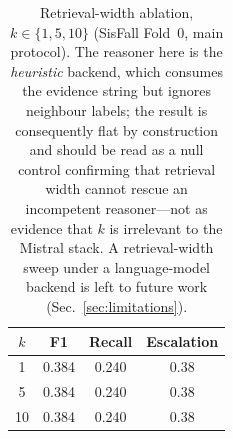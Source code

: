 \begin{table}[!t]
\centering
\caption{Retrieval-width ablation, $k\in\{1,5,10\}$ (SisFall Fold~0, main protocol). The reasoner here is the \emph{heuristic} backend, which consumes the evidence string but ignores neighbour labels; the result is consequently flat by construction and should be read as a null control confirming that retrieval width cannot rescue an incompetent reasoner---not as evidence that $k$ is irrelevant to the Mistral stack. A retrieval-width sweep under a language-model backend is left to future work (Sec.~\ref{sec:limitations}).}
\label{tab:knnk}
\begin{tabular}{cccc}
\toprule
$k$ & F1 & Recall & Escalation \\
\midrule
1  & 0.384 & 0.240 & 0.38 \\
5  & 0.384 & 0.240 & 0.38 \\
10 & 0.384 & 0.240 & 0.38 \\
\bottomrule
\end{tabular}
\end{table}
